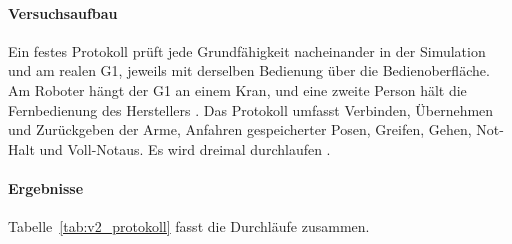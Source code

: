 \paragraph*{Versuchsaufbau}
Ein festes Protokoll prüft jede Grundfähigkeit nacheinander in der Simulation und am realen G1, jeweils mit derselben Bedienung über die Bedienoberfläche.
Am Roboter hängt der G1 an einem Kran, und eine zweite Person hält die Fernbedienung des Herstellers .
Das Protokoll umfasst Verbinden, Übernehmen und Zurückgeben der Arme, Anfahren gespeicherter Posen, Greifen, Gehen, Not-Halt und Voll-Notaus.
Es wird dreimal durchlaufen .

\paragraph*{Ergebnisse}
Tabelle~\ref{tab:v2_protokoll} fasst die Durchläufe zusammen.

